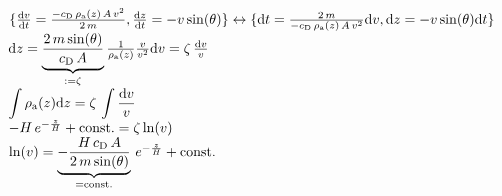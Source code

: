 \documentclass{article}
\begin{document}
$\{\frac{{\rm d}v}{{\rm d}t}=\frac{-c_{\rm D}\,\rho_{\rm a}(z)\,A\,v^{\rm 2}}{2\,m},\frac{{\rm d}z}{{\rm d}t}=-v\,{\rm sin}(\theta)\} \leftrightarrow \{{\rm d}t=\frac{2\,m}{-c_{\rm D}\,\rho_{\rm a}(z)\,A\,v^{\rm 2}}{\rm d}v,{\rm d}z=-v\,{\rm sin}(\theta){\rm d}t\}$\\[0.3cm]
${\rm d}z=\underbrace{\frac{2\,m\,{\rm sin}(\theta)}{c_{\rm D}\,A}}_{:=\zeta}\frac{1}{\rho_{\rm a}(z)}\frac{v}{v^{\rm 2}}{\rm d}v=\zeta\,\frac{{\rm d}v}{v}$\\[0.3cm]
$\displaystyle\int{\rho_{\rm a}(z){\rm d}z}=\zeta\,\int\frac{{\rm d}v}{v}$\\[0.3cm]
$-H\,e^{-\frac{z}{H}}+{\rm const.}=\zeta\,{\rm ln}(v)$\\[0.3cm]
${\rm ln}(v)=\underbrace{-\frac{H\,c_{\rm D}\,A}{2\,m\,{\rm sin}(\theta)}}_{={\rm const.}}\,e^{-\frac{z}{H}}+{\rm const.}$\\[0.3cm]
\end{document}
